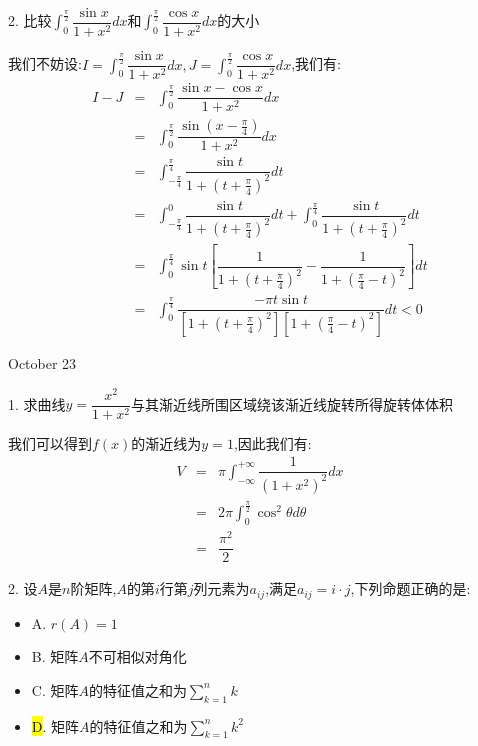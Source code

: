 2. 比较$\int_{0}^{\frac{\pi}{2}}\dfrac{\sin x}{1+x^2}dx$和$\int_{0}^{\frac{\pi}{2}}\dfrac{\cos x}{1+x^2}dx$的大小

\begin{solution}

	我们不妨设:$I=\int_{0}^{\frac{\pi}{2}}\dfrac{\sin x}{1+x^2}dx,J=\int_{0}^{\frac{\pi}{2}}\dfrac{\cos x}{1+x^2}dx$,我们有:
	\begin{eqnarray*}
		I-J&=&\int_{0}^{\frac{\pi}{2}}\dfrac{\sin x-\cos x}{1+x^2}dx\\
		&=&\int_{0}^{\frac{\pi}{2}}\dfrac{\sin(x-\frac{\pi}{4})}{1+x^2}dx\\
		&=&\int_{-\frac{\pi}{4}}^{\frac{\pi}{4}}\dfrac{\sin t}{1+(t+\frac{\pi}{4})^2}dt\\
		&=&\int_{-\frac{\pi}{4}}^{0}\dfrac{\sin t}{1+(t+\frac{\pi}{4})^2}dt+\int_{0}^{\frac{\pi}{4}}\dfrac{\sin t}{1+(t+\frac{\pi}{4})^2}dt\\
		&=&\int_{0}^{\frac{\pi}{4}}\sin t[\dfrac{1}{1+(t+\frac{\pi}{4})^2}-\dfrac{1}{1+(\frac{\pi}{4}-t)^2}]dt\\
		&=&\int_{0}^{\frac{\pi}{4}}\dfrac{-\pi t\sin t}{[1+(t+\frac{\pi}{4})^2][1+(\frac{\pi}{4}-t)^2]}dt<0
	\end{eqnarray*}
	
\end{solution}


\textcolor{purplea}{October 23}

1. 求曲线$y=\dfrac{x^2}{1+x^2}$与其渐近线所围区域绕该渐近线旋转所得旋转体体积

\begin{solution}

	我们可以得到$f(x)$的渐近线为$y=1$,因此我们有:
	\begin{eqnarray*}
		V&=&\pi\int_{-\infty}^{+\infty}\dfrac{1}{(1+x^2)^2}dx\\
		&=&2\pi\int_{0}^{\frac{\pi}{2}}\cos^2\theta d\theta\\
		&=&\dfrac{\pi^2}{2}
	\end{eqnarray*}
\end{solution}


2. 设$A$是$n$阶矩阵,$A$的第$i$行第$j$列元素为$a_{ij}$,满足$a_{ij}=i\cdot j$,下列命题正确的是:  
\begin{itemize}
	\item A. $r(A)=1$
	\item B. 矩阵$A$不可相似对角化
	\item C. 矩阵$A$的特征值之和为$\sum\limits_{k=1}^{n}k$
	\item \hl{D}. 矩阵$A$的特征值之和为$\sum\limits_{k=1}^{n}k^2$
\end{itemize}

